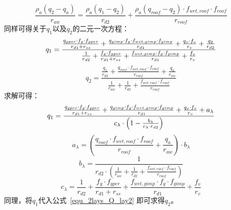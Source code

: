 %
\begin{equation}
    \frac{\rho _a \left( q_{2} - q_a\right)}{r_{aw}} = \frac{\rho _a \left( q_{1} - q_{2}\right)}{r_{d2}} + \frac{\rho _a \left( q_{roof}-q_{2}\right) \cdot f_{wet,roof} \cdot f_{roof}}{r_{roof}}
\end{equation}
同样可得关于$q_{1}$以及$q_{2}$的二元一次方程：
\begin{equation}
    q_{1} = \\
    \frac{\frac{q_{gper} \cdot f_{g} \cdot f_{gper}}{r_{d1} + r_{ss}} + \frac{q_{gimp} \cdot f_{g} \cdot f_{wet,gimp} \cdot f_{gimp}}{r_{d1}} + \frac{q_{v} \cdot f_v}{r_{v}} + \frac{q_{2}}{r_{d2}}}{\frac{1}{r_{d2}} + \frac{f_{g} \cdot f_{gper}}{r_{d1} + r_{ss}} + \frac{f_{wet,gimp} \cdot f_{g} \cdot f_{gimp}}{r_{d1}}+\frac{f_v}{r_{v}}}
\end{equation}
%
\begin{equation}\label{equ_2lays_Q_lay2}
    q_{2} = \frac{\frac{q_{1}}{r_{d2}} + \frac{q_{roof} \cdot f_{wet,roof} \cdot f_{roof}}{r_{roof}} + \frac{q_a}{r_{aw}}}{\frac{1}{r_{aw}} + \frac{1}{r_{d2}} + \frac{f_{wet,roof} \cdot f_{roof}}{r_{roof}}}
\end{equation}
求解可得：
\begin{equation}
    q_{1} = \\
    \frac{\frac{q_{gper} \cdot f_{g} \cdot f_{gper}}{r_{d1}+r_{ss}} + \frac{q_{gimp} \cdot f_{g} \cdot f_{wet,gimp} \cdot f_{gimp}}{r_{d1} } + \frac{q_{v} \cdot f_v}{r_{v}} + a_{\lambda}}{c_{\lambda} \cdot \left( 1 - \frac{b_{\lambda}}{c_{\lambda} \cdot r_{d2}}\right)}
\end{equation}
%
\begin{equation}
    a_{\lambda}= \left(\frac{q_{roof} \cdot f_{wet,roof} \cdot f_{roof}}{r_{roof}} + \frac{q_a}{r_{aw}}\right) \cdot b_{\lambda}
\end{equation}
%
\begin{equation}
    b_{\lambda} = \frac{1}{r_{d2} \cdot \left( \frac{1}{r_{aw}} + \frac{1}{r_{d2}} + \frac{f_{wet,roof} \cdot f_{roof}}{r_{roof}} \right)}
\end{equation}
%
\begin{equation}
    c_{\lambda} = \frac{1}{r_{d2}}+\frac{f_g \cdot f_{gper}}{r_{d1}+r_{ss}} + \frac{f_{wet,gimp} \cdot f_g \cdot f_{gimp}}{r_{d1}} + \frac{f_v}{r_{v}}
\end{equation}
同理，将$q_{1}$代入公式~\eqref{equ_2lays_Q_lay2} 即可求得$q_{2}$。

